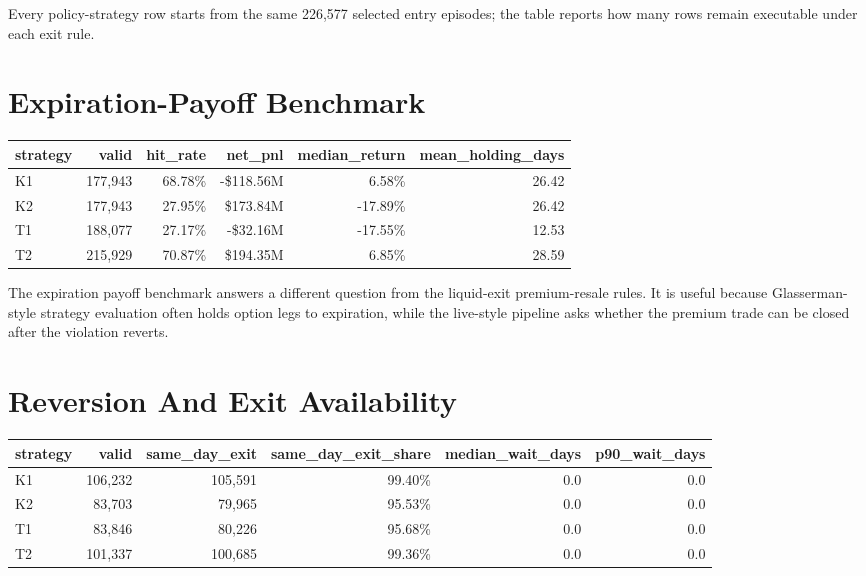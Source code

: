 \documentclass[11pt]{article}
\begin{document}
Every policy-strategy row starts from the same 226,577 selected entry episodes; the table reports how many rows remain executable under each exit rule.

\section{Expiration-Payoff Benchmark}

\begin{center}
\begin{tabular}{lrrrrr}
\toprule
strategy & valid & hit\_rate & net\_pnl & median\_return & mean\_holding\_days \\
\midrule
K1 & 177,943 & 68.78\% & -\$118.56M & 6.58\% & 26.42 \\
K2 & 177,943 & 27.95\% & \$173.84M & -17.89\% & 26.42 \\
T1 & 188,077 & 27.17\% & -\$32.16M & -17.55\% & 12.53 \\
T2 & 215,929 & 70.87\% & \$194.35M & 6.85\% & 28.59 \\
\bottomrule
\end{tabular}
\end{center}

The expiration payoff benchmark answers a different question from the liquid-exit premium-resale
rules. It is useful because Glasserman-style strategy evaluation often holds option legs to
expiration, while the live-style pipeline asks whether the premium trade can be closed after the
violation reverts.

\section{Reversion And Exit Availability}

\begin{center}
\begin{tabular}{lrrrrr}
\toprule
strategy & valid & same\_day\_exit & same\_day\_exit\_share & median\_wait\_days & p90\_wait\_days \\
\midrule
K1 & 106,232 & 105,591 & 99.40\% & 0.0 & 0.0 \\
K2 & 83,703 & 79,965 & 95.53\% & 0.0 & 0.0 \\
T1 & 83,846 & 80,226 & 95.68\% & 0.0 & 0.0 \\
T2 & 101,337 & 100,685 & 99.36\% & 0.0 & 0.0 \\
\bottomrule
\end{tabular}
\end{center}
\end{document}
